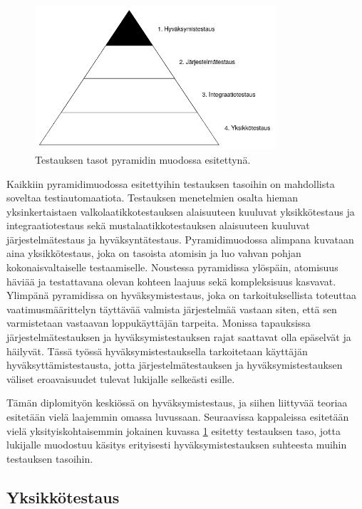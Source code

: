   \begin{figure}[H]
    \centering
    \includegraphics[width=0.8\textwidth]{assets/testauksen-tasot.png}
    \caption{Testauksen tasot pyramidin muodossa esitettynä.}
    \label{fig:testing-levels-pyramid}
  \end{figure}

  Kaikkiin pyramidimuodossa esitettyihin testauksen tasoihin on mahdollista soveltaa testiautomaatiota.
  Testauksen menetelmien osalta hieman yksinkertaistaen valkolaatikkotestauksen alaisuuteen kuuluvat yksikkötestaus ja integraatiotestaus sekä mustalaatikkotestauksen alaisuuteen kuuluvat järjestelmätestaus ja hyväksyntätestaus.
  Pyramidimuodossa alimpana kuvataan aina yksikkötestaus, joka on tasoista atomisin ja luo vahvan pohjan kokonaisvaltaiselle testaamiselle.
  Noustessa pyramidissa ylöspäin, atomisuus häviää ja testattavana olevan kohteen laajuus sekä kompleksisuus kasvavat.
  Ylimpänä pyramidissa on hyväksymistestaus, joka on tarkoituksellista toteuttaa vaatimusmäärittelyn täyttävää valmista järjestelmää vastaan siten, että sen varmistetaan vastaavan loppukäyttäjän tarpeita.
  Monissa tapauksissa järjestelmätestauksen ja hyväksymistestauksen rajat saattavat olla epäselvät ja häilyvät.
  Tässä työssä hyväksymistestauksella tarkoitetaan käyttäjän hyväksyttämistestausta, jotta järjestelmätestauksen ja hyväksymistestauksen väliset eroavaisuudet tulevat lukijalle selkeästi esille.

  Tämän diplomityön keskiössä on hyväksymistestaus, ja siihen liittyvää teoriaa esitetään vielä laajemmin omassa luvussaan.
  Seuraavissa kappaleissa esitetään vielä yksityiskohtaisemmin jokainen kuvassa \ref{fig:testing-levels-pyramid} esitetty testauksen taso, jotta lukijalle muodostuu käsitys erityisesti hyväksymistestauksen suhteesta muihin testauksen tasoihin.

  \subsection{Yksikkötestaus} \label{ch:07_yksikkotestaus}

